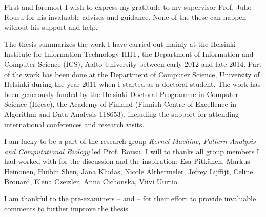 

\begin{preface}[Espoo]

First and foremost I wish to express my gratitude to my supervisor Prof. Juho Rousu for his invaluable advises and guidance.
None of the these can happen without his support and help.

The thesis summarizes the work I have carried out mainly at the Helsinki Institute for Information Technology HIIT, the Department of Information and Computer Science (ICS), Aalto University between early 2012 and late 2014.
Part of the work has been done at the Department of Computer Science, University of Helsinki during the year 2011 when I started as a doctoral student.
The work has been generously funded by the Helsinki Doctoral Programme in Computer Science (Hecse), the Academy of Finland (Finnish Centre of Excellence in Algorithm and Data Analysis 118653), including the support for attending international conferences and research visits.

I am lucky to be a part of the research group \textit{Kernel Machine, Pattern Analysis and Computational Biology} led Prof. Rousu.
I will to thanks all group members I had worked with for the discussion and the inspiration: Esa Pitk\"anen, Markus Heinonen, Huibin Shen, Jana Kludas, 
Nicole Althermeler, Jefrey Lijffijt, Celine Brouard, Elena Czeizler, Anna Cichonska, Viivi Uurtio. 




I am thankful to the pre-examiners -- and -- for their effort to provide invaluable comments to further improve the thesis.



\end{preface}
